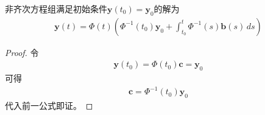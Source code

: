 \documentclass{ctexbook}
\begin{document}
\begin{corollary}
    非齐次方程组满足初始条件$\mathbf{y}(t_0)=\mathbf{y}_0$的解为\begin{align*}
    \mathbf{y}(t)=\Phi(t)\left(\Phi^{-1}(t_0)\mathbf{y}_0+\int_{t_0}^t \Phi^{-1}(s)\mathbf{b}(s)\,ds\right)
    \end{align*}
\end{corollary}

\begin{proof}
    令\begin{align*}
    \mathbf{y}(t_0)=\Phi(t_0)\mathbf{c}=\mathbf{y}_0
    \end{align*}
    可得\begin{align*}
    \mathbf{c}=\Phi^{-1}(t_0)\mathbf{y}_0
    \end{align*}    
    代入前一公式即证。
\end{proof}
\end{document}
